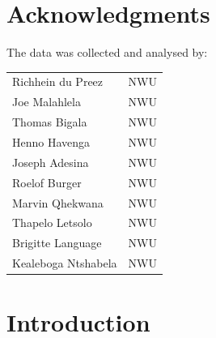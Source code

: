 \documentclass{nwureport}
\begin{document}
\pagebreak

\chapter*{Acknowledgments}

The data was collected and analysed by:
\\
\begin{tabular}{ l l } 
Richhein du Preez & NWU \\
Joe Malahlela  & NWU \\
Thomas Bigala  & NWU \\
Henno Havenga & NWU \\
Joseph Adesina & NWU \\
Roelof Burger  & NWU \\
Marvin Qhekwana & NWU \\
Thapelo Letsolo & NWU \\
Brigitte Language & NWU \\
Kealeboga Ntshabela & NWU \\
\end{tabular}

\clearpage

\dominitoc
\setcounter{tocdepth}{2} %
\pagestyle{plain}
{\thispagestyle{plain}
\tableofcontents
\clearpage
\listoffigures
{}
\clearpage
\listoftables
{}
\printglossaries
}

\pagestyle{mainmatter}


\chapter{Introduction}
\end{document}
